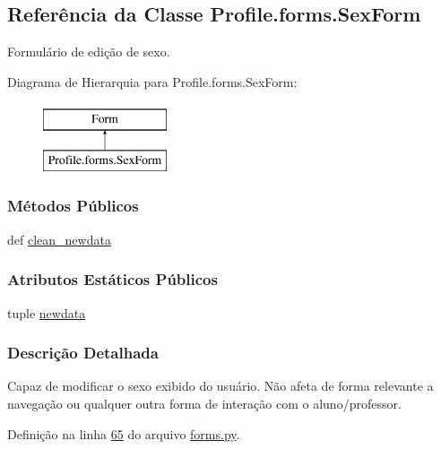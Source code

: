 \hypertarget{classProfile_1_1forms_1_1SexForm}{\subsection{Referência da Classe Profile.\-forms.\-Sex\-Form}
\label{classProfile_1_1forms_1_1SexForm}
}


Formulário de edição de sexo.  


Diagrama de Hierarquia para Profile.\-forms.\-Sex\-Form\-:\begin{figure}[H]
\begin{center}
\leavevmode
\includegraphics[height=2.000000cm]{d1/dea/classProfile_1_1forms_1_1SexForm}
\end{center}
\end{figure}
\subsubsection*{Métodos Públicos}
\begin{DoxyCompactItemize}
\item 
def \hyperlink{classProfile_1_1forms_1_1SexForm_a23eb3376f64c41fbfa57b1b78ed2a38b}{clean\-\_\-newdata}
\end{DoxyCompactItemize}
\subsubsection*{Atributos Estáticos Públicos}
\begin{DoxyCompactItemize}
\item 
tuple \hyperlink{classProfile_1_1forms_1_1SexForm_a0d99412ab99ee46149a50fabb2614845}{newdata}
\end{DoxyCompactItemize}


\subsubsection{Descrição Detalhada}
Capaz de modificar o sexo exibido do usuário. Não afeta de forma relevante a navegação ou qualquer outra forma de interação com o aluno/professor. 

Definição na linha \hyperlink{Profile_2forms_8py_source_l00065}{65} do arquivo \hyperlink{Profile_2forms_8py_source}{forms.\-py}.



